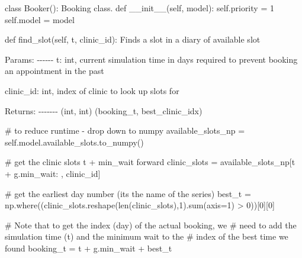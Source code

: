 \documentclass[
  letterpaper,
  DIV=11,
  numbers=noendperiod]{scrreprt}
\newenvironment{Shaded}{}{}
\newcommand{\BuiltInTok}[1]{\textcolor[rgb]{0.84,0.23,0.29}{#1}}
\newcommand{\CommentTok}[1]{\textcolor[rgb]{0.42,0.45,0.49}{#1}}
\newcommand{\DecValTok}[1]{\textcolor[rgb]{0.00,0.36,0.77}{#1}}
\newcommand{\FunctionTok}[1]{\textcolor[rgb]{0.44,0.26,0.76}{#1}}
\newcommand{\KeywordTok}[1]{\textcolor[rgb]{0.84,0.23,0.29}{#1}}
\newcommand{\NormalTok}[1]{\textcolor[rgb]{0.14,0.16,0.18}{#1}}
\newcommand{\OperatorTok}[1]{\textcolor[rgb]{0.14,0.16,0.18}{#1}}
\newcommand{\VariableTok}[1]{\textcolor[rgb]{0.89,0.38,0.04}{#1}}
\begin{document}
\begin{Shaded}
\begin{Highlighting}[]
\KeywordTok{class}\NormalTok{ Booker():}
    \CommentTok{\textquotesingle{}\textquotesingle{}\textquotesingle{}}
\CommentTok{    Booking class.}
\CommentTok{    \textquotesingle{}\textquotesingle{}\textquotesingle{}}
    \KeywordTok{def} \FunctionTok{\_\_init\_\_}\NormalTok{(}\VariableTok{self}\NormalTok{, model):}
        \VariableTok{self}\NormalTok{.priority }\OperatorTok{=} \DecValTok{1}
        \VariableTok{self}\NormalTok{.model }\OperatorTok{=}\NormalTok{ model}

    \KeywordTok{def}\NormalTok{ find\_slot(}\VariableTok{self}\NormalTok{, t, clinic\_id):}
        \CommentTok{\textquotesingle{}\textquotesingle{}\textquotesingle{}}
\CommentTok{        Finds a slot in a diary of available slot}

\CommentTok{        Params:}
\CommentTok{        {-}{-}{-}{-}{-}{-}}
\CommentTok{        t: int,}
\CommentTok{            current simulation time in days}
\CommentTok{            required to prevent booking an appointment}
\CommentTok{            in the past}

\CommentTok{        clinic\_id: int,}
\CommentTok{            index of clinic to look up slots for}

\CommentTok{        Returns:}
\CommentTok{        {-}{-}{-}{-}{-}{-}{-}}
\CommentTok{        (int, int)}
\CommentTok{        (booking\_t, best\_clinic\_idx)}

\CommentTok{        \textquotesingle{}\textquotesingle{}\textquotesingle{}}
        \CommentTok{\# to reduce runtime {-} drop down to numpy}
\NormalTok{        available\_slots\_np }\OperatorTok{=} \VariableTok{self}\NormalTok{.model.available\_slots.to\_numpy()}

        \CommentTok{\# get the clinic slots t + min\_wait forward}
\NormalTok{        clinic\_slots }\OperatorTok{=}\NormalTok{ available\_slots\_np[t }\OperatorTok{+}\NormalTok{ g.min\_wait: , clinic\_id]}

        \CommentTok{\# get the earliest day number (its the name of the series)}
\NormalTok{        best\_t }\OperatorTok{=}\NormalTok{ np.where((clinic\_slots.reshape(}\BuiltInTok{len}\NormalTok{(clinic\_slots),}\DecValTok{1}\NormalTok{).}\BuiltInTok{sum}\NormalTok{(axis}\OperatorTok{=}\DecValTok{1}\NormalTok{) }\OperatorTok{\textgreater{}} \DecValTok{0}\NormalTok{))[}\DecValTok{0}\NormalTok{][}\DecValTok{0}\NormalTok{]}

        \CommentTok{\# Note that to get the index (day) of the actual booking, we}
        \CommentTok{\# need to add the simulation time (t) and the minimum wait to the}
        \CommentTok{\# index of the best time we found}
\NormalTok{        booking\_t }\OperatorTok{=}\NormalTok{ t }\OperatorTok{+}\NormalTok{ g.min\_wait }\OperatorTok{+}\NormalTok{ best\_t}


\end{Highlighting}
\end{Shaded}
\end{document}
